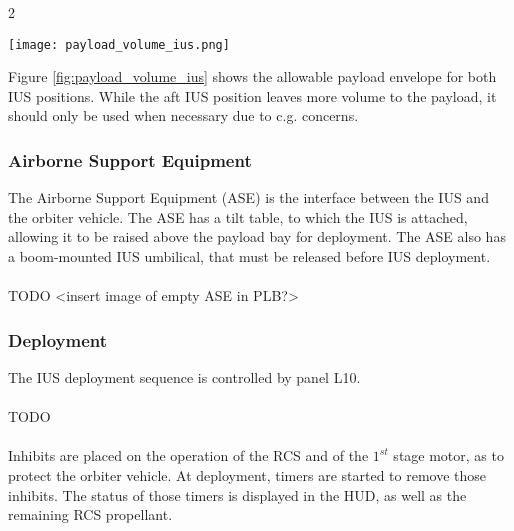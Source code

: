 \documentclass[Space_Shuttle_Ultra_Manual.tex]{subfiles}
\begin{document}
\begin{multicols*}{2}
\begin{figure*}[ht]
  \centering
  \texttt{[image: payload\_volume\_ius.png]}
  \caption{IUS Payload Envelope (dimensions in meters)}
  \label{fig:payload_volume_ius}
\end{figure*}
Figure \ref{fig:payload_volume_ius} shows the allowable payload envelope for both IUS positions. While the aft IUS position leaves more volume to the payload, it should only be used when necessary due to c.g. concerns.

\subsubsection{Airborne Support Equipment}
The Airborne Support Equipment (ASE) is the interface between the IUS and the orbiter vehicle. The ASE has a tilt table, to which the IUS is attached, allowing it to be raised above the payload bay for deployment. The ASE also has a boom-mounted IUS umbilical, that must be released before IUS deployment.
\\
\\
TODO <insert image of empty ASE in PLB?>

\subsubsection{Deployment}
The IUS deployment sequence is controlled by panel L10.
\\
\\
TODO
\\
\\
Inhibits are placed on the operation of the RCS and of the $1^{st}$ stage motor, as to protect the orbiter vehicle. At deployment, timers are started to remove those inhibits. The status of those timers is displayed in the HUD, as well as the remaining RCS propellant.


\end{multicols*}
\end{document}
